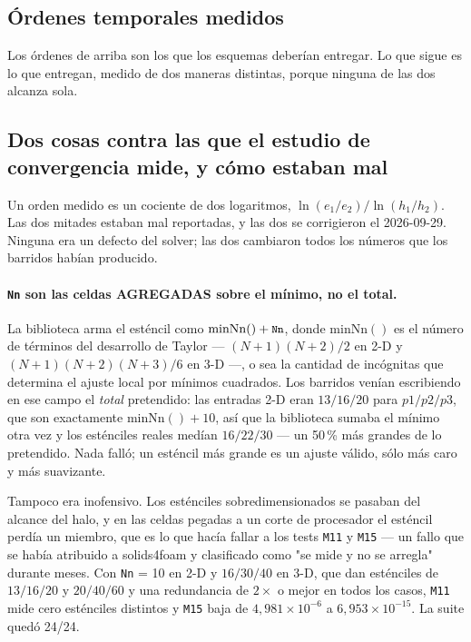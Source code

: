 \documentclass[11pt,a4paper]{article}
\newcommand{\code}[1]{\texttt{\small #1}}
\begin{document}
\subsection{Órdenes temporales medidos}
\label{sec:measured-temporal-orders}

Los órdenes de arriba son los que los esquemas deberían entregar. Lo que sigue es
lo que entregan, medido de dos maneras distintas, porque ninguna de las dos
alcanza sola.

\subsection{Dos cosas contra las que el estudio de convergencia mide, y cómo estaban mal}
\label{sec:h-and-nn}

Un orden medido es un cociente de dos logaritmos, $\ln(e_1/e_2)/\ln(h_1/h_2)$. Las dos mitades
estaban mal reportadas, y las dos se corrigieron el 2026-09-29. Ninguna era un defecto del
solver; las dos cambiaron todos los números que los barridos habían producido.

\paragraph{\code{Nn} son las celdas AGREGADAS sobre el mínimo, no el total.} La biblioteca arma
el esténcil como $\mathrm{minNn}() + \code{Nn}$, donde $\mathrm{minNn}()$ es el número de
términos del desarrollo de Taylor --- $(N{+}1)(N{+}2)/2$ en 2-D y $(N{+}1)(N{+}2)(N{+}3)/6$ en
3-D ---, o sea la cantidad de incógnitas que determina el ajuste local por mínimos cuadrados.
Los barridos venían escribiendo en ese campo el \emph{total} pretendido: las entradas 2-D eran
$13/16/20$ para $p1/p2/p3$, que son exactamente $\mathrm{minNn}()+10$, así que la biblioteca
sumaba el mínimo otra vez y los esténciles reales medían $16/22/30$ --- un 50\,\% más grandes de
lo pretendido. Nada falló; un esténcil más grande es un ajuste válido, sólo más caro y más
suavizante.

Tampoco era inofensivo. Los esténciles sobredimensionados se pasaban del alcance del halo, y en
las celdas pegadas a un corte de procesador el esténcil perdía un miembro, que es lo que hacía
fallar a los tests \code{M11} y \code{M15} --- un fallo que se había atribuido a solids4foam y
clasificado como "se mide y no se arregla" durante meses. Con \code{Nn} = 10 en 2-D y
$16/30/40$ en 3-D, que dan esténciles de $13/16/20$ y $20/40/60$ y una redundancia de
$2\times$ o mejor en todos los casos, \code{M11} mide cero esténciles distintos y \code{M15}
baja de $4{,}981\times10^{-6}$ a $6{,}953\times10^{-15}$. La suite quedó 24/24.
\end{document}
